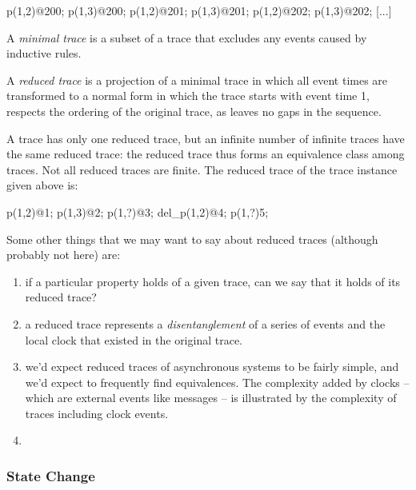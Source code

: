 \begin{Dedalus}
p(1,2)@200;
p(1,3)@200;
p(1,2)@201;
p(1,3)@201;
p(1,2)@202;
p(1,3)@202;
[...]
\end{Dedalus}



\begin{definition}
A \emph{minimal trace} is a subset of a trace that excludes any events caused by inductive rules.
\end{definition}

\begin{definition}
A \emph{reduced trace} is a projection of a minimal trace in which all event times are transformed
to a normal form in which the trace starts with event time 1, respects the ordering of the original trace, as leaves no gaps in the sequence.
\end{definition}

A trace has only one reduced trace, but an infinite number of infinite traces have the same reduced trace: the reduced trace thus forms an 
equivalence class among traces.  Not all reduced traces are finite.  The reduced trace of the trace instance given above is:

\begin{Dedalus}
p(1,2)@1;
p(1,3)@2;
p(1,?)@3;
del_p(1,2)@4;
p(1,?)5;
\end{Dedalus}

Some other things that we may want to say about reduced traces (although probably not here) are:
\begin{enumerate}
\item if a particular property holds of a given trace, can we say that it holds of its reduced trace?
\item a reduced trace represents a \emph{disentanglement} of a series of events and the local clock that existed in the original trace.
\item we'd expect reduced traces of asynchronous systems to be fairly simple, and we'd expect to frequently find equivalences.
The complexity added by clocks -- which are external events like messages -- is illustrated by the complexity of traces including
clock events. 
\item 

\end{enumerate}


\subsubsection{State Change}

